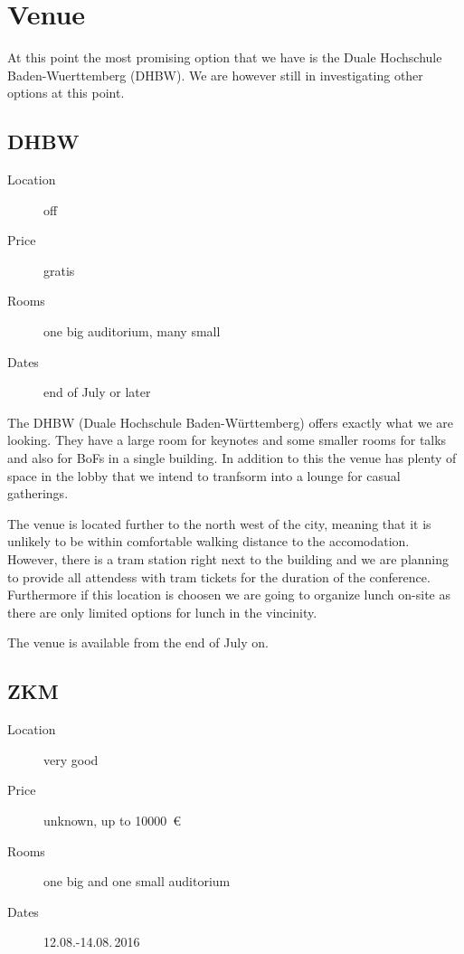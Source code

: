 
\section{Venue}

At this point the most promising option that we have is the Duale Hochschule
Baden-Wuerttemberg (DHBW). We are however still in investigating other options
at this point.

\subsection{DHBW}
\begin{description}
\item[Location] off
\item[Price] gratis
\item[Rooms] one big auditorium, many small
\item[Dates] end of July or later
\end{description}

The DHBW (Duale Hochschule Baden-Württemberg) offers exactly what we are looking.
They have a large room for keynotes and some smaller rooms for talks and
also for BoFs in a single building. In addition to this the venue has
plenty of space in the lobby that we intend to tranfsorm into a lounge for
casual gatherings.

The venue is located further to the north west of the city, meaning that it is
unlikely to be within comfortable walking distance to the accomodation. However,
there is a tram station right next to the building and we are planning
to provide all attendess with tram tickets for the duration of the
conference. Furthermore if this location is choosen we are going to organize
lunch on-site as there are only limited options for lunch in the vincinity.

The venue is available from the end of July on.


\subsection{ZKM}
\begin{description}
\item[Location] very good
\item[Price] unknown, up to \SI{10000}{\euro}
\item[Rooms] one big and one small auditorium
\item[Dates] 12.08.-14.08.\,2016
\end{description}

